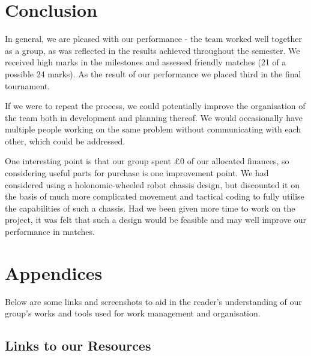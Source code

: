 \documentclass[a4paper,11pt]{article}
\begin{document}

\section{Conclusion}

In general, we are pleased with our performance - the team worked well together as a group, as was reflected in the results achieved throughout the semester. We received high marks in the milestones and assessed friendly matches (21 of a possible 24 marks). As the result of our performance we placed third in the final tournament.

If we were to repeat the process, we could potentially improve the organisation of the team both in development and planning thereof. We would occasionally have multiple people working on the same problem without communicating with each other, which could be addressed.

One interesting point is that our group spent £0 of our allocated finances, so considering useful parts for purchase is one improvement point. We had considered using a holonomic-wheeled robot chassis design, but discounted it on the basis of much more complicated movement and tactical coding to fully utilise the capabilities of such a chassis. Had we been given more time to work on the project, it was felt that such a design would be feasible and may well improve our performance in matches.
    
    
    

\section{Appendices}

Below are some links and screenshots to aid in the reader's understanding of our group's works and tools used for work management and organisation. 

\subsection{Links to our Resources}
\end{document}
